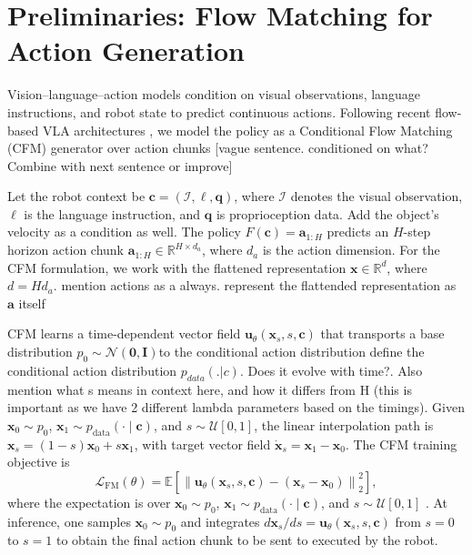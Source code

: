 \documentclass[10pt,twocolumn,letterpaper]{article}
\newcommand{\EditAP}[1]{{\color{blue} #1}}
\begin{document}
\section{Preliminaries: Flow Matching for Action Generation}
\label{sec:prelim}

Vision--language--action models condition on visual observations, language
instructions, and robot state to predict continuous actions. Following recent
flow-based VLA architectures \citep{black2025pi0}, we model the policy as a
Conditional Flow Matching (CFM) generator over action chunks \EditAP{[vague sentence. conditioned on what? Combine with next sentence or improve]}

Let the robot context be
$\mathbf c=(\mathcal I,\ell,\mathbf q)$, where $\mathcal I$ denotes the
visual observation, $\ell$ is the language instruction,
and $\mathbf q$ is proprioception data. \EditAP{Add the object's velocity as a condition as well}. The policy $F(\mathbf c) =\mathbf a_{1:H} $ predicts an $H$-step horizon action chunk $\mathbf a_{1:H}\in\mathbb R^{H\times d_a}$, where $d_a$ is the action dimension.
For the CFM formulation, we work with the flattened representation $\mathbf x\in\mathbb R^d$, where $d=H d_a$. \EditAP{mention actions as a always. represent the flattended representation as $\mathbf a $ itself}

CFM learns a time-dependent vector field
$\mathbf u_\theta(\mathbf x_s,s,\mathbf c)$ that transports a base
distribution $p_0 \sim \mathcal{N}(\mathbf 0 , \mathbf I)$to the conditional action distribution \EditAP{define the conditional action distribution $p_{data}(.|c)$. Does it evolve with time?. Also mention what s means in context here, and how it differs from H (this is important as we have 2 different lambda parameters based on the timings)}.
Given $\mathbf x_0\sim p_0$, $\mathbf x_1\sim p_{\mathrm{data}}(\cdot\mid\mathbf c)$,
and $s\sim\mathcal U[0,1]$, the linear interpolation path is
$\mathbf x_s=(1-s)\mathbf x_0+s\mathbf x_1$,
with target vector field $\dot{\mathbf x}_s=\mathbf x_1-\mathbf x_0$.
The CFM training objective is
\begin{equation}
    \mathcal L_{\mathrm{FM}}(\theta)
    =
    \mathbb E
    \left[
        \left\|
            \mathbf u_\theta(\mathbf x_s,s,\mathbf c)
            -
            (\mathbf x_s-\mathbf x_0)
        \right\|_2^2
    \right],
    \label{eq:fm_loss}
\end{equation}
where the expectation is over
$\mathbf x_0\sim p_0$, $\mathbf x_1\sim p_{\mathrm{data}}(\cdot\mid\mathbf c)$,
and $s\sim\mathcal U[0,1]$ \citep{lipman2023flow,tong2023conditional}.
At inference, one samples $\mathbf x_0\sim p_0$ and integrates
$d\mathbf x_s/ds=\mathbf u_\theta(\mathbf x_s,s,\mathbf c)$ from $s=0$ to
$s=1$ to obtain the final action chunk to be sent to executed by the robot.
\end{document}
